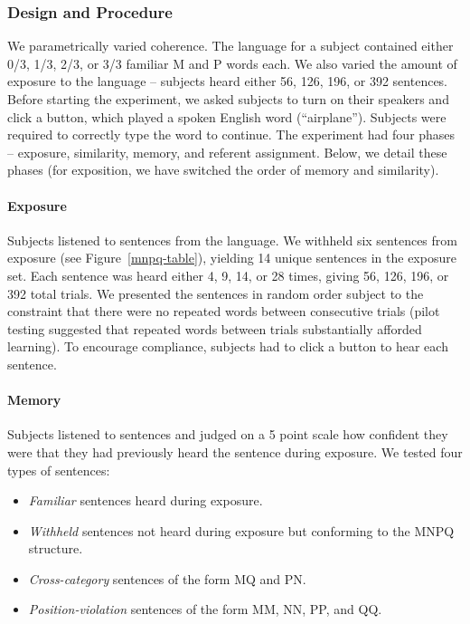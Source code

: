 \documentclass[man,floatsintext]{apa6}
\begin{document}
\subsubsection{Design and Procedure}

We parametrically varied coherence. The language for a subject
contained either 0/3, 1/3, 2/3, or 3/3 familiar M and P words each. We
also varied the amount of exposure to the language -- subjects heard
either 56, 126, 196, or 392 sentences. Before starting the experiment,
we asked subjects to turn on their speakers and click a button, which
played a spoken English word (``airplane''). Subjects were required to
correctly type the word to continue. The experiment had four phases --
exposure, similarity, memory, and referent assignment. Below, we
detail these phases (for exposition, we have switched the order of
memory and similarity).

\paragraph{Exposure} Subjects listened to sentences from the
language. We withheld six sentences from exposure (see
Figure~\ref{mnpq-table}), yielding 14 unique sentences in the exposure
set. Each sentence was heard either 4, 9, 14, or 28 times, giving 56,
126, 196, or 392 total trials. We presented the sentences in random
order subject to the constraint that there were no repeated words
between consecutive trials (pilot testing suggested that repeated
words between trials substantially afforded learning). To encourage
compliance, subjects had to click a button to hear each sentence.

\paragraph{Memory} Subjects listened to sentences and judged on a 5
point scale how confident they were that they had previously heard the
sentence during exposure. We tested four types of sentences:

\begin{itemize}
\item \emph{Familiar} sentences heard during exposure.
\item \emph{Withheld} sentences not heard during exposure but
conforming to the MNPQ structure.
\item \emph{Cross-category} sentences of the form MQ and PN.
\item \emph{Position-violation} sentences of the form MM, NN, PP, and
QQ.
\end{itemize}
\end{document}
